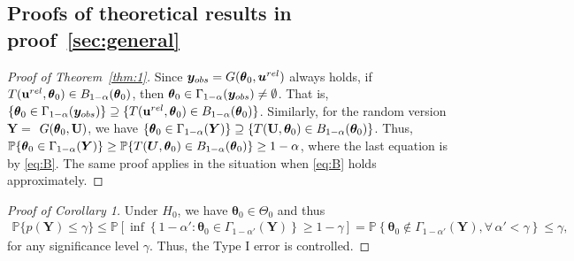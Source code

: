 \documentclass[12pt]{article}
\theoremstyle{shortspace}
\def\*#1{\bm{#1}}
\def\btheta{\mathop{\theta\kern-.45em\hbox{$\theta$}}\nolimits}
\def\P{\mathbb P}
\begin{document}
\subsection{Proofs of theoretical results in proof~\ref{sec:general}}
\label{sec:proof_sec2}



\begin{proof}[Proof of Theorem~\ref{thm:1}]

Since $\*y_{obs} = G({\btheta}_0, {\*u}^{rel})$ always holds, if 
$T({\bf u}^{rel}, \btheta_0)  \in B_{1 - \alpha}(\btheta_0)$, then $\btheta_0 \in \Gamma_{1-\alpha}(\*y_{obs}) \not = \emptyset$. That is, 
$\{\btheta_0 \in \Gamma_{1-\alpha}(\*y_{obs})\} \supseteq \{T({\bf u}^{rel}, \btheta_0)  \in B_{1 - \alpha}(\btheta_0)\}$. 
Similarly, for the random version~$\*Y = $ $ G({\btheta}_0, {\bf U})$, we have $\left\{\btheta_0 \in \Gamma_{1-\alpha}({\*Y})\right\} \supseteq \left\{T({\bf U}, \*\theta_0) \in B_{1 -\alpha}(\*\theta_0)\right\}$. Thus, 
$\P\{\btheta_0 \in \Gamma_{1-\alpha}(\*Y)\} \ge \P\{T(\*U, \btheta_0) \in B_{1 -\alpha}(\btheta_0)\} \ge 1- \alpha$, where the last equation is by \eqref{eq:B}. The same proof applies in the situation when \eqref{eq:B} holds approximately.
\end{proof}


\begin{proof}[Proof of Corollary 1]

 Under $H_0$, we have $\*\theta_0 \in \Theta_0$ and thus
    \begin{align*} \P\{p(\*Y) \leq \gamma\}
    \leq  \P \left[\inf\left\{1-\alpha': \*\theta_0 \in \Gamma_{1-\alpha'}(\*Y)\right\} \geq 1 - \gamma \right]  
    = \P \left\{ \*\theta_0 \not\in \Gamma_{1-\alpha' }(\*Y),  
    \forall \, \alpha' <  \gamma \right\} \leq \gamma,
    \end{align*}
    for any significance level  $\gamma.$ Thus, the Type I error is controlled. 
\end{proof}
\end{document}
